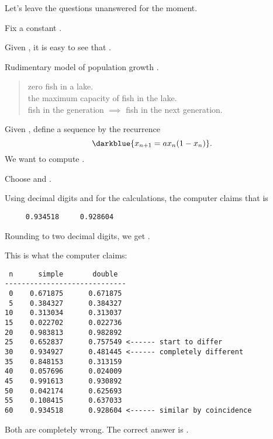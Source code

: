 \documentclass%
[%
Screen4to3,
]{foils}
\begin{document}
Let's leave the questions unanswered for the moment.


Fix a constant .

Given , it is easy to see that .

\vfill

Rudimentary model of population growth .
\begin{quote}
 zero fish in a lake. \\
 the maximum capacity of fish in the lake. \\
 fish in the  generation
$\implies$  fish in the next generation.
\end{quote}

\vfill


Given , define a sequence by the recurrence
\[
\darkblue{x_{n+1} = ax_n(1-x_n)}.
\]
We want to compute .



Choose  and .


\vfill

Using  decimal digits  and
  for the calculations, the
computer claims that  is

\begin{verbatim}
     0.934518     0.928604
\end{verbatim}
Rounding to two decimal digits, we get .

\vfill



This is what the computer claims:
\begin{verbatim}
 n      simple       double           
-----------------------------
 0    0.671875      0.671875
 5    0.384327      0.384327
10    0.313034      0.313037
15    0.022702      0.022736
20    0.983813      0.982892
25    0.652837      0.757549 <------ start to differ
30    0.934927      0.481445 <------ completely different
35    0.848153      0.313159
40    0.057696      0.024009
45    0.991613      0.930892
50    0.042174      0.625693
55    0.108415      0.637033
60    0.934518      0.928604 <------ similar by coincidence
\end{verbatim}
Both are completely wrong. The correct answer is .
\end{document}
